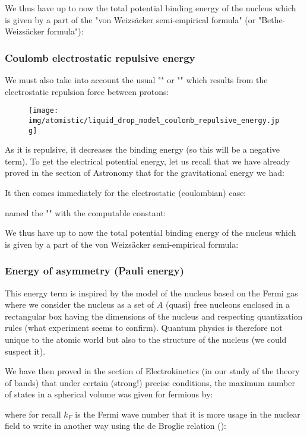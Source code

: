 	We thus have up to now the total potential binding energy of the nucleus which is given by a part of the "von Weizsäcker semi-empirical formula" (or "Bethe-Weizsäcker formula"):
	
	
	\subsubsection{Coulomb electrostatic repulsive energy}
	We must also take into account the usual "" or "" which results from the electrostatic repulsion force between protons:
	\begin{figure}[H]
		\centering
		\texttt{[image: img/atomistic/liquid\_drop\_model\_coulomb\_repulsive\_energy.jpg]}
	\end{figure}
	As it is repulsive, it decreases the binding energy (so this will be a negative term). To get the electrical potential energy, let us recall that we have already proved in the section of Astronomy that for the gravitational energy we had:
	
	It then comes immediately for the electrostatic (coulombian) case:
	
	named the "" with the computable constant:
	
	We thus have up to now the total potential binding energy of the nucleus which is given by a part of the von Weizsäcker semi-empirical formula:
	
	
	\subsubsection{Energy of asymmetry (Pauli energy)}
	This energy term is inspired by the model of the nucleus based on the Fermi gas where we consider the nucleus as a set of $A$ (quasi) free nucleons enclosed in a rectangular box having the dimensions of the nucleus and respecting quantization rules (what experiment seems to confirm). Quantum physics is therefore not unique to the atomic world but also to the structure of the nucleus (we could suspect it).

	We have then proved in the section of Electrokinetics (in our study of the theory of bands) that under certain (strong!) precise conditions, the maximum number of states in a spherical volume was given for fermions by:
	
	where for recall $k_F$ is the Fermi wave number that it is more usage in the nuclear field to write in another way using the de Broglie relation ():
	
